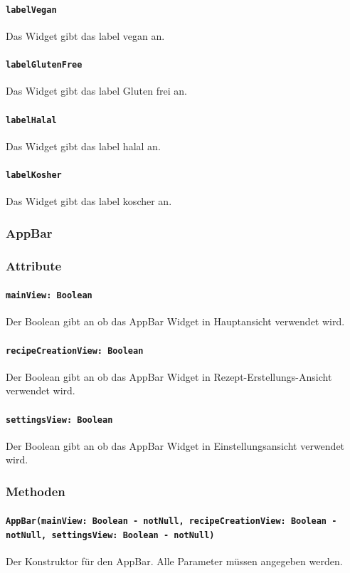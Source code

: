 \documentclass[parskip=full]{scrartcl}
\begin{document}
            \paragraph*{\texttt{labelVegan}} Das Widget gibt das \gls{label} vegan an.
            \paragraph*{\texttt{labelGlutenFree}} Das Widget gibt das \gls{label} Gluten frei an.
            \paragraph*{\texttt{labelHalal}} Das Widget gibt das \gls{label} halal an.
            \paragraph*{\texttt{labelKosher}} Das Widget gibt das \gls{label} koscher an.

    \subsubsection{AppBar} \label{sec:AppBar}
        \subsubsection*{Attribute}
            \paragraph*{\texttt{mainView: Boolean}} Der Boolean gibt an ob das AppBar Widget in Hauptansicht verwendet wird.
            \paragraph*{\texttt{recipeCreationView: Boolean}} Der Boolean gibt an ob das AppBar Widget in Rezept-Erstellungs-Ansicht verwendet wird.
            \paragraph*{\texttt{settingsView: Boolean}} Der Boolean gibt an ob das AppBar Widget in Einstellungsansicht verwendet wird.
            
        \subsubsection*{Methoden}
            \paragraph*{\texttt{AppBar(mainView: Boolean - notNull, recipeCreationView: Boolean - notNull, settingsView: Boolean - notNull)}} Der Konstruktor für den AppBar. Alle Parameter müssen angegeben werden. 
\end{document}
